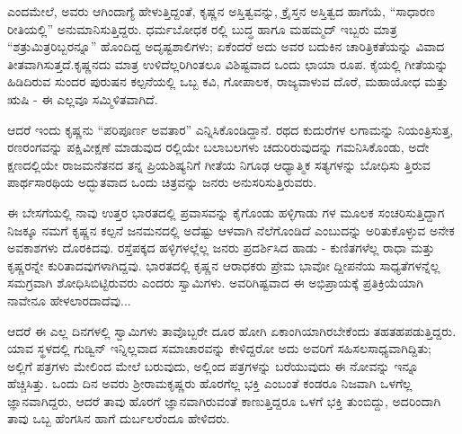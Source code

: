 ಎಂದಮೇಲೆ, ಅವರು ಆಗಿಂದಾಗ್ಯೆ ಹೇಳುತ್ತಿದ್ದಂತೆ, ಕೃಷ್ಣನ ಅಸ್ತಿತ್ವವನ್ನು, ಕ್ರೈಸ್ತನ ಅಸ್ತಿತ್ವದ ಹಾಗೆಯೆ, “ಸಾಧಾರಣ ರೀತಿಯಲ್ಲಿ” ಅನುಮಾನಿಸುತ್ತಿದ್ದರು. ಧರ್ಮಬೋಧಕ ರಲ್ಲಿ ಬುದ್ಧ ಹಾಗೂ ಮಹಮ್ಮದ್ ಇಬ್ಬರು ಮಾತ್ರ “ಶತ್ರುಮಿತ್ರರಿಬ್ಬರನ್ನೂ” ಹೊಂದಿದ್ದ ಅದೃಷ್ಟಶಾಲಿಗಳು; ಏಕೆಂದರೆ ಅದು ಅವರ ಬದುಕಿನ ಚಾರಿತ್ರಿಕತೆಯನ್ನು ವಿವಾದ ತೀತವಾಗಿಸುತ್ತದೆ.ಕೃಷ್ಣನದು ಮಾತ್ರ ಉಳಿದೆಲ್ಲರಿಗಿಂತಲೂ ವಿಶಿಷ್ಟವಾದ ಒಂದು ಛಾಯಾ ರೂಪ. ಕೈಯಲ್ಲಿ ಗೀತೆಯನ್ನು ಹಿಡಿದಿರುವ ಸುಂದರ ಪುರುಷನ ಕಲ್ಪನೆಯಲ್ಲಿ ಒಬ್ಬ ಕವಿ, ಗೋಪಾಲಕ, ರಾಜ್ಯವಾಳುವ ದೊರೆ, ಮಹಾಯೋಧ ಮತ್ತು ಋಷಿ - ಈ ಎಲ್ಲವೂ ಸಮ್ಮಿಳಿತವಾಗಿದೆ.

ಆದರೆ ಇಂದು ಕೃಷ್ಣನು “ಪರಿಪೂರ್ಣ ಅವತಾರ” ಎನ್ನಿಸಿಕೊಂಡಿದ್ದಾನೆ. ರಥದ ಕುದುರೆಗಳ ಲಗಾಮನ್ನು ನಿಯಂತ್ರಿಸುತ್ತ, ರಣರಂಗವನ್ನು ಪಕ್ಷಿವೀಕ್ಷಣೆ ಮಾಡುವುದ ರಲ್ಲಿಯೇ ಬಲಾಬಲಗಳು ಚದುರಿರುವುದನ್ನು ಗಮನಿಸಿಕೊಂಡು, ಅದೇ ಕ್ಷಣದಲ್ಲಿಯೇ ರಾಜಮನೆತನದ ತನ್ನ ಪ್ರಿಯಶಿಷ್ಯನಿಗೆ ಗೀತೆಯ ನಿಗೂಢ ಆಧ್ಯಾತ್ಮಿಕ ಸತ್ಯಗಳನ್ನು ಬೋಧಿಸು ತ್ತಿರುವ ಪಾರ್ಥಸಾರಥಿಯ ಅದ್ಭುತವಾದ ಒಂದು ಚಿತ್ರವನ್ನು ಜನರು ಅನುಸರಿಸುತ್ತಿರುವರು.

ಈ ಬೇಸಗೆಯಲ್ಲಿ ನಾವು ಉತ್ತರ ಭಾರತದಲ್ಲಿ ಪ್ರವಾಸವನ್ನು ಕೈಗೊಂಡು ಹಳ್ಳಿಗಾಡು ಗಳ ಮೂಲಕ ಸಂಚರಿಸುತ್ತಿದ್ದಾಗ ನಿಜಕ್ಕೂ ನಮಗೆ ಕೃಷ್ಣನ ಕಲ್ಪನೆ ಜನಮನದಲ್ಲಿ ಅದೆಷ್ಟು ಆಳವಾಗಿ ನೆಲೆಗೊಂಡಿದೆ ಎಂಬುದನ್ನು ಅರಿತುಕೊಳ್ಳುವ ಅನೇಕ ಅವಕಾಶಗಳು ದೊರಕಿದವು. ರಸ್ತೆಪಕ್ಕದ ಹಳ್ಳಿಗಳಲ್ಲೆಲ್ಲ ಜನರು ಪ್ರದರ್ಶಿಸಿದ ಹಾಡು - ಕುಣಿತಗಳೆಲ್ಲ ರಾಧಾ ಮತ್ತು ಕೃಷ್ಣರನ್ನೇ ಕುರಿತಾದವುಗಳಾಗಿದ್ದವು. ಭಾರತದಲ್ಲಿ ಕೃಷ್ಣನ ಆರಾಧಕರು ಪ್ರೇಮ ಭಾವೋ ದ್ದೀಪನೆಯ ಸಾಧ್ಯತೆಗಳನ್ನೆಲ್ಲ ಸಮಗ್ರವಾಗಿ ಶೋಧಿಸಿಬಿಟ್ಟಿರುವರು ಎಂದರು ಸ್ವಾಮಿಗಳು. ಅವರಿಗಿಷ್ಟವಾದ ಈ ಅಭಿಪ್ರಾಯಕ್ಕೆ ಪ್ರತಿಕ್ರಿಯೆಯಾಗಿ ನಾವೇನೂ ಹೇಳಲಾರದಾದೆವು...

ಆದರೆ ಈ ಎಲ್ಲ ದಿನಗಳಲ್ಲಿ ಸ್ವಾಮಿಗಳು ತಾವೊಬ್ಬರೇ ದೂರ ಹೋಗಿ ಏಕಾಂಗಿಯಾಗಿರಬೇಕೆಂದು ತಹತಹಪಡುತ್ತಿದ್ದರು. ಯಾವ ಸ್ಥಳದಲ್ಲಿ ಗುಡ್ವಿನ್ ಇನ್ನಿಲ್ಲವಾದ ಸಮಾಚಾರವನ್ನು ಕೇಳಿದ್ದರೋ ಅದು ಅವರಿಗೆ ಸಹಿಸಲಸಾಧ್ಯವಾಗಿದ್ದಿತು; ಅಲ್ಲಿಗೆ ಪತ್ರಗಳು ಮೇಲಿಂದ ಮೇಲೆ ಬರುವುದು, ಅಲ್ಲಿಂದ ಪತ್ರಗಳನ್ನು ಬರೆಯುವುದು ಈ ನೋವನ್ನು ಇನ್ನೂ ಹೆಚ್ಚಿಸಿತ್ತು. ಒಂದು ದಿನ ಅವರು ಶ‍್ರೀರಾಮಕೃಷ್ಣರು ಹೊರಗೆಲ್ಲ ಭಕ್ತಿ ಎಂಬಂತೆ ಕಂಡರೂ ನಿಜವಾಗಿ ಒಳಗೆಲ್ಲ ಜ್ಞಾನವಾಗಿದ್ದರು, ಆದರೆ ತಾವು ಹೊರಗೆ ಜ್ಞಾನವಾಗಿರುವಂತೆ ಕಾಣುತ್ತಿದ್ದರೂ ಒಳಗೆ ಭಕ್ತಿ ತುಂಬಿದ್ದು, ಅದರಿಂದಾಗಿ ತಾವು ಒಬ್ಬ ಹೆಂಗಸಿನ ಹಾಗೆ ದುರ್ಬಲರೆಂದೂ ಹೇಳಿದರು.

